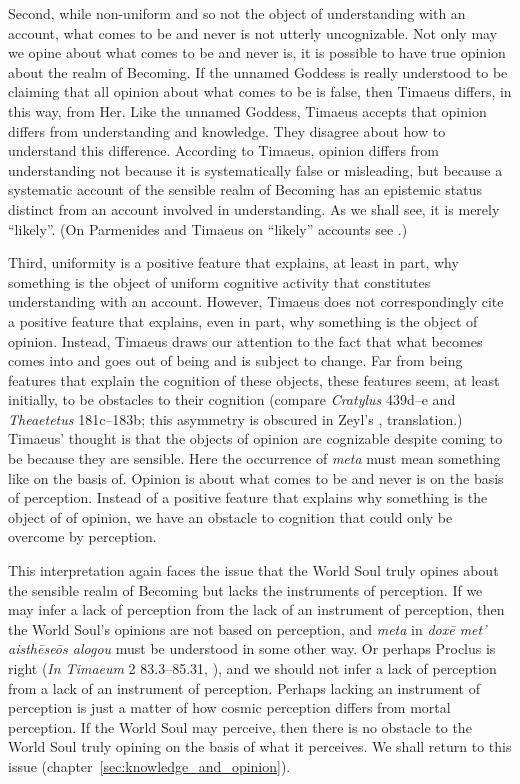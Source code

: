 Second, while non-uniform and so not the object of understanding with an account, what comes to be and never is not utterly uncognizable. Not only may we opine about what comes to be and never is, it is possible to have true opinion about the realm of Becoming. If the unnamed Goddess is really understood to be claiming that all opinion about what comes to be is false, then Timaeus differs, in this way, from Her. Like the unnamed Goddess, Timaeus accepts that opinion differs from understanding and knowledge. They disagree about how to understand this difference. According to Timaeus, opinion differs from understanding not because it is systematically false or misleading, but because a systematic account of the sensible realm of Becoming has an epistemic status distinct from an account involved in understanding. As we shall see, it is merely ``likely''. (On Parmenides and Timaeus on ``likely'' accounts see \citealt{Bryan:2012bt}.)

Third, uniformity is a positive feature that explains, at least in part, why something is the object of uniform cognitive activity that constitutes understanding with an account. However, Timaeus does not correspondingly cite a positive feature that explains, even in part, why something is the object of opinion. Instead, Timaeus draws our attention to the fact that what becomes comes into and goes out of being and is subject to change. Far from being features that explain the cognition of these objects, these features seem, at least initially, to be obstacles to their cognition (compare \emph{Cratylus} 439d–e and \emph{Theaetetus} 181c–183b; this asymmetry is obscured in Zeyl's \citeyear[13]{Zeyl:2000cs}, translation.) Timaeus' thought is that the objects of opinion are cognizable despite coming to be because they are sensible. Here the occurrence of \emph{meta} must mean something like on the basis of. Opinion is about what comes to be and never is on the basis of perception. Instead of a positive feature that explains why something is the object of of opinion, we have an obstacle to cognition that could only be overcome by perception.

This interpretation again faces the issue that the World Soul truly opines about the sensible realm of Becoming but lacks the instruments of perception. If we may infer a lack of perception from the lack of an instrument of perception, then the World Soul's opinions are not based on perception, and \emph{meta} in \emph{doxē met’ aisthēseōs alogou} must be understood in some other way. Or perhaps Proclus is right (\emph{In Timaeum} 2 83.3–85.31, \citealt{Diehl:1903re}), and we should not infer a lack of perception from a lack of an instrument of perception. Perhaps lacking an instrument of perception is just a matter of how cosmic perception differs from mortal perception. If the World Soul may perceive, then there is no obstacle to the World Soul truly opining on the basis of what it perceives. We shall return to this issue (chapter~\ref{sec:knowledge_and_opinion}).


